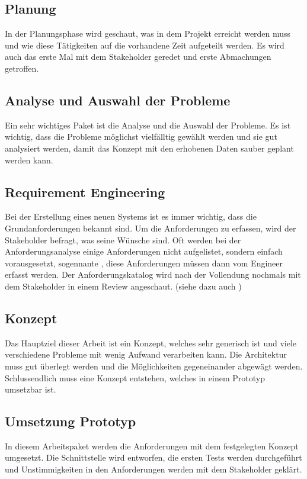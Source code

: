 \subsection{Planung}\label{planung}
In der Planungsphase wird geschaut, was in dem Projekt erreicht werden muss und wie diese Tätigkeiten auf die vorhandene Zeit aufgeteilt werden. Es wird auch das erste Mal mit dem 
Stakeholder geredet und erste Abmachungen getroffen.

\subsection{Analyse und Auswahl der Probleme}\label{analyse_auswahl_probleme}
Ein sehr wichtiges Paket ist die Analyse und die Auswahl der Probleme. Es ist wichtig, dass die Probleme möglichst vielfälltig gewählt werden und sie gut analysiert werden, damit das Konzept 
mit den erhobenen Daten sauber geplant werden kann.

\subsection{Requirement Engineering}\label{rqe}
Bei der Erstellung eines neuen Systems ist es immer wichtig, dass die Grundanforderungen bekannt sind. Um die Anforderungen zu erfassen, wird der Stakeholder befragt, was seine Wünsche 
sind. Oft werden bei der Anforderungsanalyse einige Anforderungen nicht aufgelistet, sondern einfach vorausgesetzt, sogennante , diese Anforderungen müssen dann vom 
Engineer erfasst werden. Der Anforderungskatalog wird nach der Vollendung nochmals mit dem Stakeholder in einem Review angeschaut. (siehe dazu auch \cite{req_eng_book})

\subsection{Konzept}\label{ref_backend}
Das Hauptziel dieser Arbeit ist ein Konzept, welches sehr generisch ist und viele verschiedene Probleme mit wenig Aufwand verarbeiten kann. Die Architektur muss gut überlegt werden und die 
Möglichkeiten gegeneinander abgewägt werden. Schlussendlich muss eine Konzept entstehen, welches in einem Prototyp umsetzbar ist.

\subsection{Umsetzung Prototyp}\label{eng_prototyp}
In diesem Arbeitspaket werden die Anforderungen mit dem festgelegten Konzept umgesetzt. Die Schnittstelle wird entworfen, die ersten Tests werden durchgeführt und Unstimmigkeiten in den 
Anforderungen werden mit dem Stakeholder geklärt.

